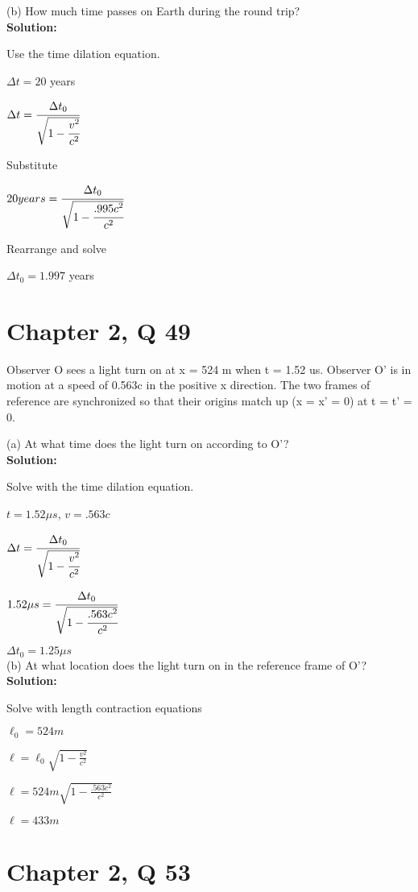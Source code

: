 \documentclass{article}
\begin{document}
(b) How much time passes on Earth during the round trip? \\

\textbf{Solution:}

Use the time dilation equation.

$ \Delta t = 20 $ years

$\Delta t = \cfrac{\Delta t_0}{\sqrt{1-\cfrac{v^2}{c^2}}}$

Substitute

$20 years = \cfrac{\Delta t_0}{\sqrt{1-\cfrac{.995c^2}{c^2}}}$

Rearrange and solve

$ \Delta t_0 = 1.997 $ years



\section*{Chapter 2, Q 49}
Observer O sees a light turn on at x = 524 m when
t = 1.52 us. Observer O' is in motion at a speed of 0.563c
in the positive x direction. The two frames of reference are
synchronized so that their origins match up (x = x' = 0) at
t = t' = 0.

(a) At what time does the light turn on according to O'? \\

\textbf{Solution:}

Solve with the time dilation equation.

$t = 1.52 \mu s$, $v = .563c$

$\Delta t = \cfrac{\Delta t_0}{\sqrt{1-\cfrac{v^2}{c^2}}}$

$1.52 \mu s = \cfrac{\Delta t_0}{\sqrt{1-\cfrac{.563c^2}{c^2}}}$

$\Delta t_0 = 1.25 \mu s$ \\

(b) At what location does the light turn on in the reference frame of O'? \\

\textbf{Solution:}

Solve with length contraction equations

$\ell_0 = 524 m$

$\ell = \ell_0 \sqrt{1 - \frac{v^2}{c^2}}$

$\ell = 524m \sqrt{1 - \frac{.563c^2}{c^2}}$

$\ell = 433 m$


\section*{Chapter 2, Q 53}
\end{document}
